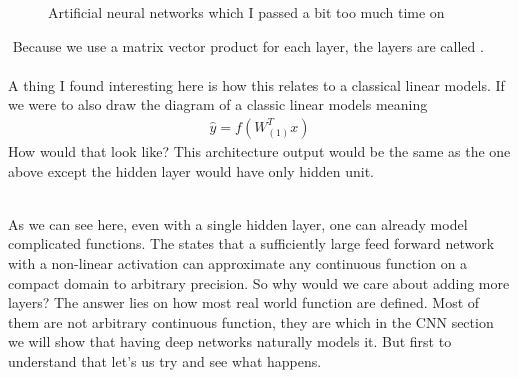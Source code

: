 \begin{figure}[h!]
\caption{Artificial neural networks which I passed a bit too much time on}
\end{figure}


\begin{parag}{$ $}
	Because we use a matrix vector product for each layer, the layers are called .\\
	$ $\\
	A thing I found interesting here is how this relates to a classical linear models. If we were to also draw the diagram of a classic linear models meaning 
	\begin{align*} 
		\hat{y} = f\left(W_{\left(1\right)}^{T}x\right)
	\end{align*}
	How would that look like? This architecture output would be the same as the one above except the hidden layer would have only  hidden unit.
\end{parag}
$ $\\
As we can see here, even with a single hidden layer, one can already model complicated functions. The  states that a sufficiently large feed forward network with a non-linear activation can approximate any continuous function on a compact domain to arbitrary precision. So why would we care about adding more layers? The answer lies on how most real world function are defined. Most of them are not arbitrary continuous function, they are  which in the CNN section we will show that having deep networks naturally models it. But first to understand that let's us try and see what happens. 


